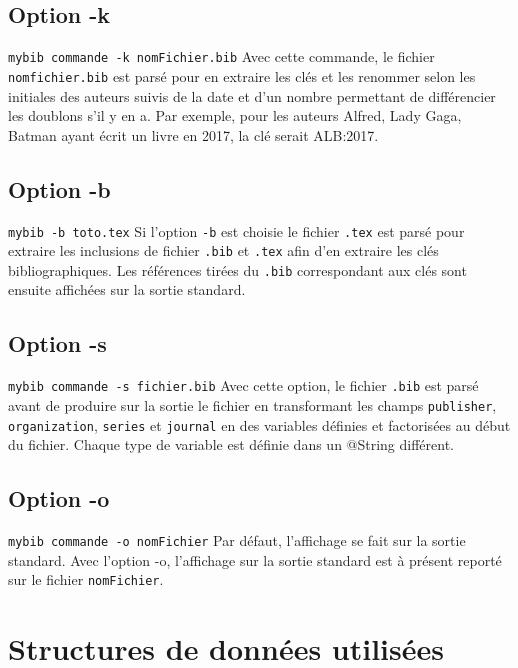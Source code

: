 \documentclass[hidelinks, a4paper,11pt,twoside,final]{article}
\begin{document}
\subsection{Option -k}
\texttt{mybib commande -k nomFichier.bib}
\newline
Avec cette commande, le fichier \texttt{nomfichier.bib} est parsé pour en extraire les clés et les renommer selon les initiales des auteurs suivis 
de la date et d'un nombre permettant de différencier les doublons s'il y en a.
Par exemple, pour les auteurs Alfred, Lady Gaga, Batman ayant écrit un livre en 2017, la clé serait ALB:2017.

\subsection{Option -b}
\texttt{mybib -b toto.tex}
\newline
Si l'option \texttt{-b} est choisie le fichier \texttt{.tex} est parsé pour extraire les inclusions de fichier \texttt{.bib} et \texttt{.tex}
afin d'en extraire les clés bibliographiques. 
Les références tirées du \texttt{.bib} correspondant aux clés sont ensuite affichées sur la sortie standard.

\subsection{Option -s}
\texttt{mybib commande -s fichier.bib}
\newline
Avec cette option, le fichier \texttt{.bib} est parsé avant de produire sur la sortie
le fichier en transformant les champs \texttt{publisher}, \texttt{organization}, \texttt{series} et  \texttt{journal}
en des variables définies et factorisées au début du fichier. 
Chaque type de variable est définie dans un @String différent.

\subsection{Option -o}
\texttt{mybib commande -o nomFichier}
\newline
Par défaut, l'affichage se fait sur la sortie standard. 
Avec l'option -o, l'affichage sur la sortie standard est à présent reporté sur le fichier \texttt{nomFichier}.


\section{Structures de données utilisées}
\end{document}
